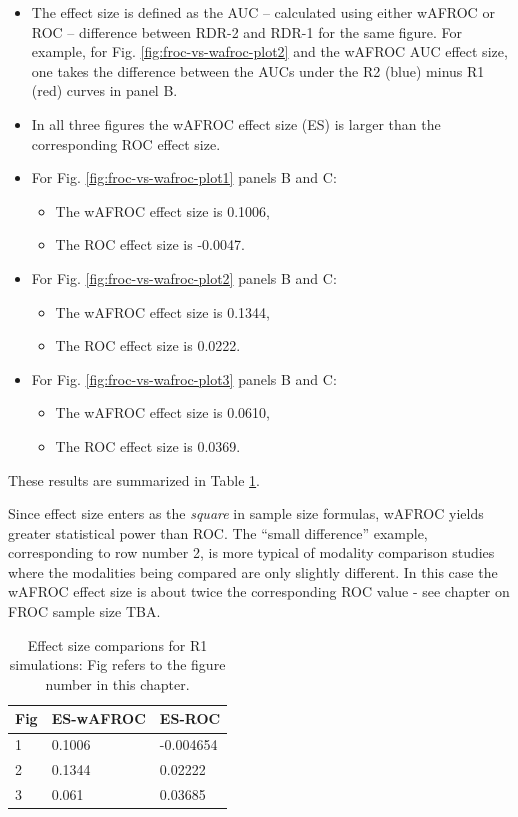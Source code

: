 \documentclass[
]{book}
\providecommand{\tightlist}{%
  \setlength{\itemsep}{0pt}\setlength{\parskip}{0pt}}
\begin{document}
\begin{itemize}
\tightlist
\item
  The effect size is defined as the AUC -- calculated using either wAFROC or ROC -- difference between RDR-2 and RDR-1 for the same figure. For example, for Fig. \ref{fig:froc-vs-wafroc-plot2} and the wAFROC AUC effect size, one takes the difference between the AUCs under the R2 (blue) minus R1 (red) curves in panel B.
\item
  In all three figures the wAFROC effect size (ES) is larger than the corresponding ROC effect size.
\item
  For Fig. \ref{fig:froc-vs-wafroc-plot1} panels B and C:

  \begin{itemize}
  \tightlist
  \item
    The wAFROC effect size is 0.1006,
  \item
    The ROC effect size is -0.0047.
  \end{itemize}
\item
  For Fig. \ref{fig:froc-vs-wafroc-plot2} panels B and C:

  \begin{itemize}
  \tightlist
  \item
    The wAFROC effect size is 0.1344,
  \item
    The ROC effect size is 0.0222.
  \end{itemize}
\item
  For Fig. \ref{fig:froc-vs-wafroc-plot3} panels B and C:

  \begin{itemize}
  \tightlist
  \item
    The wAFROC effect size is 0.0610,
  \item
    The ROC effect size is 0.0369.
  \end{itemize}
\end{itemize}

These results are summarized in Table \ref{tab:froc-vs-wafroc-effect-size-rdr2}.

Since effect size enters as the \emph{square} in sample size formulas, wAFROC yields greater statistical power than ROC. The ``small difference'' example, corresponding to row number 2, is more typical of modality comparison studies where the modalities being compared are only slightly different. In this case the wAFROC effect size is about twice the corresponding ROC value - see chapter on FROC sample size TBA.

\begin{table}

\caption{\label{tab:froc-vs-wafroc-effect-size-rdr2}Effect size comparions for R1 simulations: Fig refers to the figure number in this chapter.}
\centering
\begin{tabular}[t]{l|l|l}
\hline
Fig & ES-wAFROC & ES-ROC\\
\hline
1 & 0.1006 & -0.004654\\
\hline
2 & 0.1344 & 0.02222\\
\hline
3 & 0.061 & 0.03685\\
\hline
\end{tabular}
\end{table}
\end{document}
